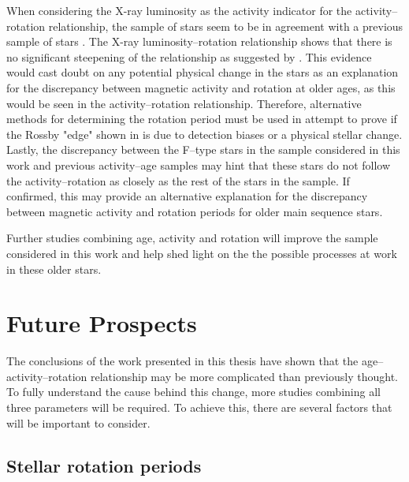 When considering the X-ray luminosity as the activity indicator for the activity--rotation relationship, the sample of stars seem to be in agreement with a previous sample of stars \citep{Wright_etal_2011}. The X-ray luminosity--rotation relationship shows that there is no significant steepening of the relationship as suggested by \citet{Booth_etal_2017}. This evidence would cast doubt on any potential physical change in the stars as an explanation for the discrepancy between magnetic activity and rotation at older ages, as this would be seen in the activity--rotation relationship. Therefore, alternative methods for determining the rotation period must be used in attempt to prove if the Rossby "edge" shown in \citet{van_Saders_etal_2019} is due to detection biases or a physical stellar change. Lastly, the discrepancy between the F--type stars in the sample considered in this work and previous activity--age samples may hint that these stars do not follow the activity--rotation as closely as the rest of the stars in the sample. If confirmed, this may provide an alternative explanation for the discrepancy between magnetic activity and rotation periods for older main sequence stars.

Further studies combining age, activity and rotation will improve the sample considered in this work and help shed light on the the possible processes at work in these older stars.

\section{Future Prospects}

The conclusions of the work presented in this thesis have shown that the age--activity--rotation relationship may be more complicated than previously thought. To fully understand the cause behind this change, more studies combining all three parameters will be required. To achieve this, there are several factors that will be important to consider.

\subsection{Stellar rotation periods}

